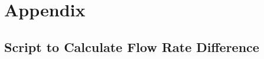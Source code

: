 \newpage
\section*{Appendix}
\subsection*{Script to Calculate Flow Rate Difference}

\begin{listing}[H]
    
\end{listing}
